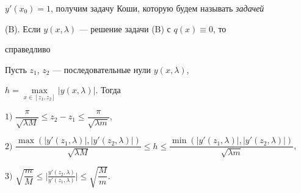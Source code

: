 $y'(x_0)=1$, получим задачу Коши, которую будем называть {\it задачей} 


(B). Если $y(x,\lambda)$ --- решение задачи (B) с $q(x)\equiv0$, то 


справедливо 


 


\begin{assrt} 


Пусть $z_1$, $z_2$ --- последовательные нули $y(x,\lambda)$, 


$h=\max\limits_{x\in[z_1,z_2]}|y(x,\lambda)|$. Тогда 


 


$1)$ $\dfrac{\pi}{\sqrt{\lambda M}}\le z_2-z_1\le 


\dfrac{\pi}{\sqrt{\lambda m}}$, 


 


$2)$ $\dfrac{\max(|y'(z_1,\lambda)|,|y'(z_2,\lambda)|)} 


{\sqrt{\lambda M}}\le h\le 


\dfrac{\min(|y'(z_1,\lambda)|,|y'(z_2,\lambda)|)} 


{\sqrt{\lambda m}}$, 


 


$3)$ $\sqrt{\dfrac{m}{M}}\le\bigg| 


\frac{y'(z_2,\lambda)}{y'(z_1,\lambda)}\bigg|\le 


\sqrt{\dfrac{M}{m}}$. 


\end{assrt} 


 



